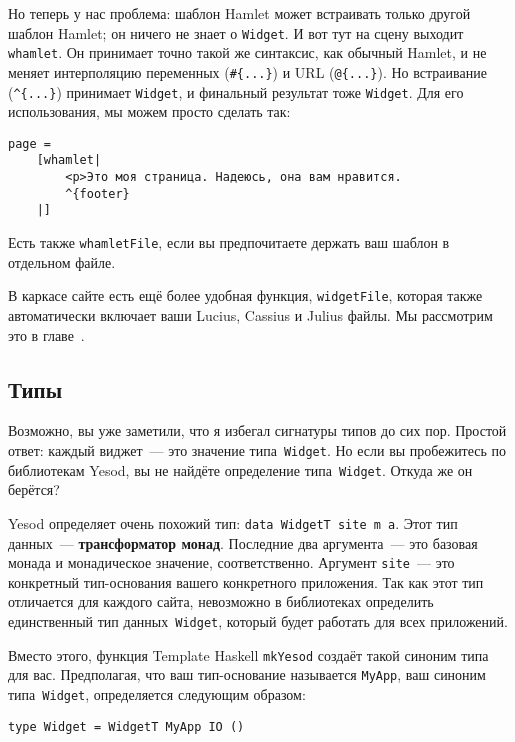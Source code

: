 Но теперь у нас проблема: шаблон Hamlet может встраивать только другой шаблон
Hamlet; он ничего не знает о \lstinline'Widget'. И вот тут на сцену выходит
\lstinline'whamlet'. Он принимает точно такой же синтаксис, как обычный Hamlet,
и не меняет интерполяцию переменных (\lstinline'#{...}')  и URL
(\lstinline'@{...}'). Но встраивание (\lstinline'^{...}') принимает
\lstinline'Widget', и финальный результат тоже \lstinline'Widget'. Для его
использования, мы можем просто сделать так:
\begin{lstlisting}
page =
    [whamlet|
        <p>Это моя страница. Надеюсь, она вам нравится.
        ^{footer}
    |]
\end{lstlisting}

Есть также \lstinline'whamletFile', если вы предпочитаете держать ваш шаблон в
отдельном файле.

\begin{remark}
    В каркасе сайте есть ещё более удобная функция, \lstinline'widgetFile',
    которая также автоматически включает ваши Lucius, Cassius и Julius файлы.
    Мы рассмотрим это в главе~.
\end{remark}

\subsection{Типы}
Возможно, вы уже заметили, что я избегал сигнатуры типов до сих пор. Простой
ответ: каждый виджет~--- это значение типа~\lstinline'Widget'. Но если вы
пробежитесь по библиотекам Yesod, вы не найдёте определение
типа~\lstinline'Widget'. Откуда же он берётся?

Yesod определяет очень похожий тип: \lstinline'data WidgetT site m a'. Этот тип
данных~--- \textbf{трансформатор монад}. Последние два аргумента~--- это
базовая монада и монадическое значение, соответственно. Аргумент
\lstinline'site'~--- это конкретный тип-основания вашего конкретного
приложения. Так как этот тип отличается для каждого сайта, невозможно в
библиотеках определить единственный тип данных~\lstinline'Widget', который будет
работать для всех приложений.

Вместо этого, функция Template Haskell \lstinline'mkYesod' создаёт такой
синоним типа для вас. Предполагая, что ваш тип-основание называется
\lstinline'MyApp', ваш синоним типа~\lstinline'Widget', определяется следующим
образом:
\begin{lstlisting}
type Widget = WidgetT MyApp IO ()
\end{lstlisting}


